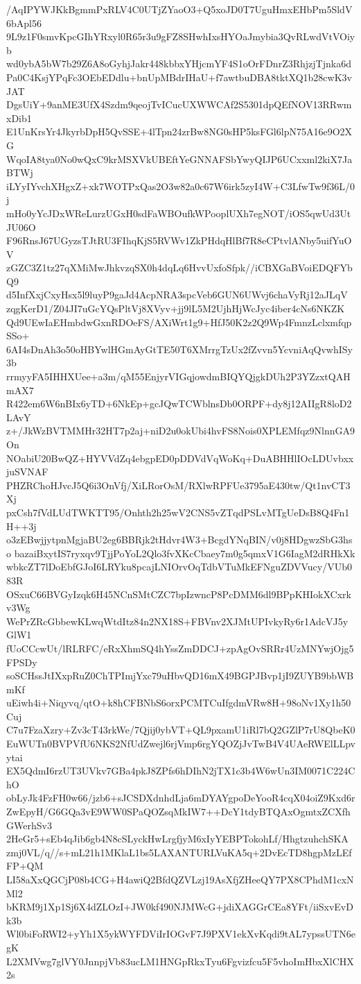 /AqIPYWJKkBgmmPxRLV4C0UTjZYaoO3+Q5xoJD0T7UguHmxEHbPm5SldV6bApl56
9L9z1F0smvKpcGIhYRxyl0R65r3u9gFZ8SHwhIxsHYOaJmybia3QvRLwdVtVOiyb
wd0ybA5bW7b29Z6A8oGyhjJakr448kbbxYHjcmYF4S1oOrFDnrZ3RhjzjTjnka6d
Pa0C4KsjYPqFc3OEbEDdlu+bnUpMBdrIHaU+f7awtbuDBA8tktXQ1b28cwK3vJAT
DgsUiY+9anME3UfX4Szdm9qeojTvICucUXWWCAf2S5301dpQEfNOV13RRwmxDib1
E1UnKrsYr4JkyrbDpH5QvSSE+4lTpn24zrBw8NG0sHP5ksFGl6lpN75A16e9O2XG
WqoIA8tya0No0wQxC9krMSXVkUBEftYeGNNAFSbYwyQIJP6UCxxml2kiX7JaBTWj
iLYyIYvchXHgxZ+xk7WOTPxQas2O3w82a0c67W6irk5zyI4W+C3LfwTw9f36L/0j
mHo0yYcJDxWReLurzUGxH0sdFaWBOufkWPooplUXh7egNOT/iOS5qwUd3UtJU06O
F96RnsJ67UGyzsTJtRU3FIhqKjS5RVWv1ZkPHdqHlBf7R8eCPtvlANby5uifYuOV
zGZC3Z1tz27qXMiMwJhkvzqSX0h4dqLq6HvvUxfoSfpk//iCBXGaBVoiEDQFYbQ9
d5InfXxjCxyHsx5l9luyP9gaJd4AcpNRA3spcVeb6GUN6UWvj6chaVyRj12aJLqV
zqgKerD1/Z04JI7uGcYQsPltVj8XVyv+jj9lL5M2UjhHjWcJyc4iber4cNs6NKZK
Qd9UEwIaEHmbdwGxnRDOeFS/AXiWrt1g9+HfJ50K2z2Q9Wp4FmnzLclxmfqpSSo+
6AI4sDnAh3o50oHBYwlHGmAyGtTE50T6XMrrgTzUx2fZvvn5YcvniAqQvwhISy3b
rrmyyFA5IHHXUee+a3m/qM55EnjyrVIGqjowdmBIQYQjgkDUh2P3YZzxtQAHmAX7
R422em6W6nBIx6yTD+6NkEp+gcJQwTCWblnsDb0ORPF+dy8j12AIIgR8loD2LAvY
z+/JkWzBVTMMHr32HT7p2aj+niD2u0okUbi4hvFS8Nois0XPLEMfqz9NlnnGA9On
NOabiU20BwQZ+HYVVdZq4ebgpED0pDDVdVqWoKq+DuABHHlIOcLDUvbxxjuSVNAF
PHZRChoHJvcJ5Q6i3OnVfj/XiLRorOsM/RXlwRPFUe3795aE430tw/Qt1nvCT3Xj
pxCsh7fVdLUdTWKTT95/Onhth2h25wV2CNS5vZTqdPSLvMTgUeDsB8Q4Fn1H++3j
o3zEBwjjytpnMgjaBU2eg6BBRjk2tHdvr4W3+BcgdYNqBIN/v0j8HDgwzSbG3hso
bazaiBxytIS7ryxqv9TjjPoYoL2Qlo3fvXKcCbaey7m0g5qmxV1G6IagM2dRHkXk
wbkcZT7lDoEbfGJoI6LRYku8pcajLNIOrvOqTdbVTuMkEFNguZDVVucy/VUb083R
OSxuC66BVGyIzqk6H45NCnSMtCZC7bpIzwncP8PcDMM6dl9BPpKHIokXCxrkv3Wg
WePrZRcGbbewKLwqWtdItz84n2NX18S+FBVnv2XJMtUPIvkyRy6r1AdcVJ5yGlW1
fUoCCcwUt/lRLRFC/eRxXhmSQ4hYssZmDDCJ+zpAgOvSRRr4UzMNYwjOjg5FPSDy
soSCHssJtIXxpRuZ0ChTPImjYxc79uHbvQD16mX49BGPJBvp1jI9ZUYB9bbWBmKf
uEiwh4i+Niqyvq/qtO+k8hCFBNbS6orxPCMTCuIfgdmVRw8H+98oNv1Xy1h50Cuj
C7u7FzaXzry+Zv3cT43rkWe/7Qjij0ybVT+QL9pxamU1iRl7bQ2GZlP7rU8QbeK0
EuWUTn0BVPVfU6NKS2NfUdZwejl6rjVmp6rgYQOZjJvTwB4V4UAeRWElLLpvytai
EX5QdmI6rzUT3UVkv7GBa4pkJ8ZPfs6hDIhN2jTX1c3b4W6wUn3IM0071C224ChO
obLyJk4FzFH0w66/jzb6+sJCSDXdnhdLja6mDYAYgpoDeYooR4cqX04oiZ9Kxd6r
ZwEpyH/G6GQa3vE9WW0SPaQOZsqMkIW7++DcY1tdyBTQAxOgmtxZCXfhGWerhSv3
2HeGr5+sEb4qJib6gb4N8cSLyckHwLrgfjyM6xIyYEBPTokohLf/HhgtzuhchSKA
zmj0VL/q//s+mL21h1MKlaL1bs5LAXANTURLVuKA5q+2DvEcTD8hgpMzLEfFP+QM
LI58aXxQGCjP08b4CG+H4awiQ2BfdQZVLzj19AsXfjZHeeQY7PX8CPhdM1cxNMl2
bKRM9j1Xp1Sj6X4dZLOzI+JW0kf490NJMWcG+jdiXAGGrCEa8YFt/iiSxvEvDk3b
Wl0biFoRWI2+yYh1X5ykWYFDViIrIOGvF7J9PXV1ekXvKqdi9tAL7ypssUTN6egK
L2XMVwg7glVY0JnnpjVb83ucLM1HNGpRkxTyu6Fgvizfcu5F5vhoImHbxXlCHX2s
